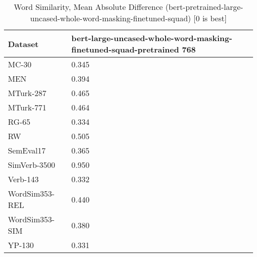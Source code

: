 \begin{table}[]
\centering
\begin{tabular}{l|l}
\hline
Dataset & bert-large-uncased-whole-word-masking-finetuned-squad-pretrained 768 \\
\hline
MC-30 & 0.345 \\ 
MEN & 0.394 \\ 
MTurk-287 & 0.465 \\ 
MTurk-771 & 0.464 \\ 
RG-65 & 0.334 \\ 
RW & 0.505 \\ 
SemEval17 & 0.365 \\ 
SimVerb-3500 & 0.950 \\ 
Verb-143 & 0.332 \\ 
WordSim353-REL & 0.440 \\ 
WordSim353-SIM & 0.380 \\ 
YP-130 & 0.331
\end{tabular}
\caption{Word Similarity, Mean Absolute Difference (bert-pretrained-large-uncased-whole-word-masking-finetuned-squad) [0 is best]}
\label{tab:similarity-bert-pretrained-large-uncased-whole-word-masking-finetuned-squad}
\end{table}
